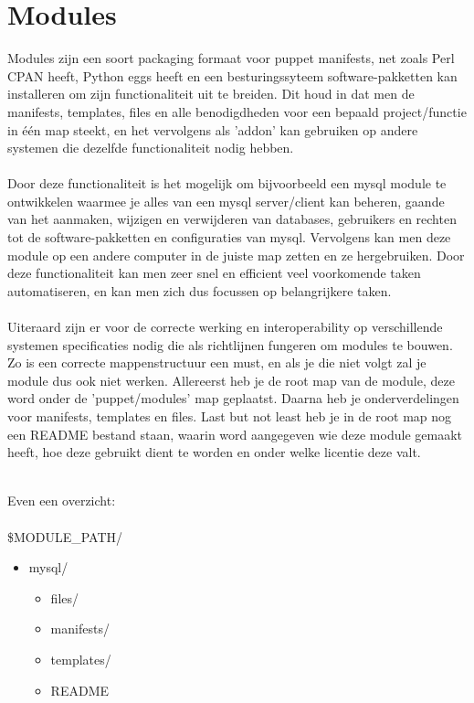 \chapter{Modules}

Modules zijn een soort packaging formaat voor puppet manifests, net zoals Perl CPAN heeft, Python eggs heeft en een besturingssyteem software-pakketten kan installeren om zijn functionaliteit uit te breiden. Dit houd in dat men de manifests, templates, files en alle benodigdheden voor een bepaald project/functie in \'{e}\'{e}n map steekt, en het vervolgens als 'addon' kan gebruiken op andere systemen die dezelfde functionaliteit nodig hebben.\\\\
Door deze functionaliteit is het mogelijk om bijvoorbeeld een mysql module te ontwikkelen waarmee je alles van een mysql server/client kan beheren, gaande van het aanmaken, wijzigen en verwijderen van databases, gebruikers en rechten tot de software-pakketten en configuraties van mysql. Vervolgens kan men deze module op een andere computer in de juiste map zetten en ze hergebruiken. Door deze functionaliteit kan men zeer snel en efficient veel voorkomende taken automatiseren, en kan men zich dus focussen op belangrijkere taken.\\\\
Uiteraard zijn er voor de correcte werking en interoperability op verschillende systemen specificaties nodig die als richtlijnen fungeren om modules te bouwen. Zo is een correcte mappenstructuur een must, en als je die niet volgt zal je module dus ook niet werken. Allereerst heb je de root map van de module, deze word onder de 'puppet/modules' map geplaatst. Daarna heb je onderverdelingen voor manifests, templates en files. Last but not least heb je in de root map nog een README bestand staan, waarin word aangegeven wie deze module gemaakt heeft, hoe deze gebruikt dient te worden en onder welke licentie deze valt.\\\\
\begin{samepage}
Even een overzicht:\\\\
\$MODULE\_PATH/
	\begin{itemize}
	\item mysql/
		\begin{itemize}
		\item files/
		\item manifests/
		\item templates/
		\item README
		\end{itemize}
	\end{itemize}
\end{samepage}
